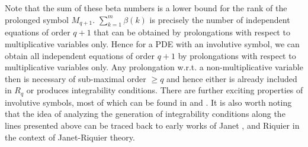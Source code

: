 Note that the sum of these beta numbers is a lower bound for the rank of the prolonged symbol $M_{q+1}$. $\sum_{k=1}^m \beta(k)$ is precisely the number of independent equations of order $q+1$ that can be obtained by prolongations with respect to multiplicative variables only.  
Hence for a PDE with an involutive symbol, we can obtain all independent equations of order $q+1$ by prolongations with respect to multiplicative variables only. Any prolongation w.r.t. a non-multiplicative variable then is necessary of sub-maximal order $\geq q$ and hence either is already included in $R_q$ or produces integrability conditions. There are further exciting properties of involutive symbols, most of which can be found in \cite{seiler2009involution} and \cite{seiler2009involution}. It is also worth noting that the idea of analyzing the generation of integrability conditions along the lines presented above can be traced back to early works of Janet \cite{janet1920systemes}, \cite{MSM_1927__21__1_0} and Riquier \cite{bateman_1910} in the context of Janet-Riquier theory.

